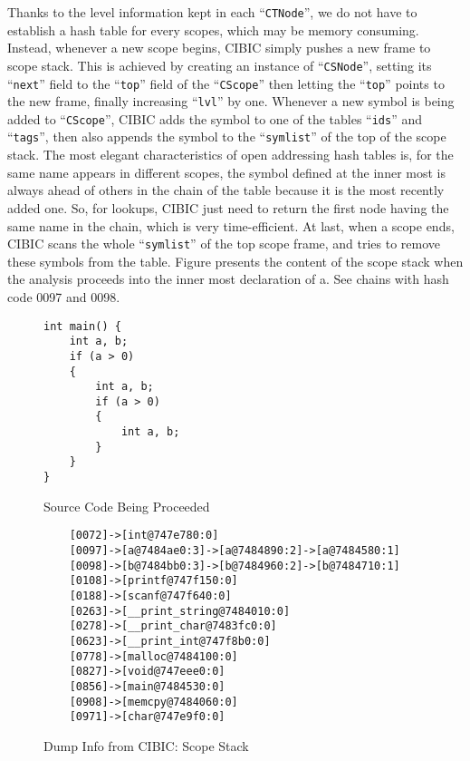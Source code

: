 \documentclass[10pt, a4paper]{article}
\begin{document}
Thanks to the level information kept in each ``\texttt{CTNode}'', we do not
have to establish a hash table for every scopes, which may be memory consuming.
Instead, whenever a new scope begins, CIBIC simply pushes a new frame to scope
stack. This is achieved by creating an instance of ``\texttt{CSNode}'', setting its
``\texttt{next}'' field to the ``\texttt{top}'' field of the
``\texttt{CScope}'' then letting the ``\texttt{top}'' points to the new frame,
finally increasing ``\texttt{lvl}'' by one. Whenever a new symbol is being added
to ``\texttt{CScope}'', CIBIC adds the symbol to one of the tables
``\texttt{ids}'' and ``\texttt{tags}'', then also appends the symbol to the
``\texttt{symlist}'' of the top of the scope stack. The most elegant characteristics of
open addressing hash tables is, for the same name appears in different scopes,
the symbol defined at the inner most is always ahead of others in the chain of
the table because it is the most recently added one. So, for lookups, CIBIC
just need to return the first node having the same name in the chain, which is very
time-efficient. At last, when a scope ends, CIBIC scans the whole
``\texttt{symlist}'' of the top scope frame, and tries to remove these symbols
from the table. Figure presents the content of the scope stack when the
analysis proceeds into the inner most declaration of a. See chains with hash
code 0097 and 0098.
\begin{figure}[H]
    \centering
    \begin{verbatim}
int main() {
    int a, b;
    if (a > 0)
    {
        int a, b;
        if (a > 0)
        {
            int a, b;
        }
    }
}
    \end{verbatim}
\caption {Source Code Being Proceeded}
\end{figure}

\begin{figure}[H]
    \centering
    \begin{BVerbatim}
    [0072]->[int@747e780:0]
    [0097]->[a@7484ae0:3]->[a@7484890:2]->[a@7484580:1]
    [0098]->[b@7484bb0:3]->[b@7484960:2]->[b@7484710:1]
    [0108]->[printf@747f150:0]
    [0188]->[scanf@747f640:0]
    [0263]->[__print_string@7484010:0]
    [0278]->[__print_char@7483fc0:0]
    [0623]->[__print_int@747f8b0:0]
    [0778]->[malloc@7484100:0]
    [0827]->[void@747eee0:0]
    [0856]->[main@7484530:0]
    [0908]->[memcpy@7484060:0]
    [0971]->[char@747e9f0:0]
    \end{BVerbatim}
    \caption {Dump Info from CIBIC: Scope Stack}
\end{figure}
\end{document}
